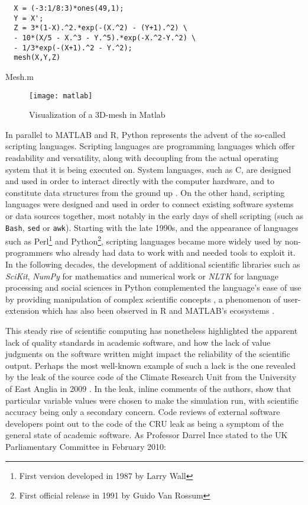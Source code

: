 \begin{listing}

  \begin{verbatim}
  X = (-3:1/8:3)*ones(49,1);
  Y = X';
  Z = 3*(1-X).^2.*exp(-(X.^2) - (Y+1).^2) \
  - 10*(X/5 - X.^3 - Y.^5).*exp(-X.^2-Y.^2) \
  - 1/3*exp(-(X+1).^2 - Y.^2);
  mesh(X,Y,Z)
\end{verbatim}
  \caption{Mesh.m}
  \label{code:mesh_m}
\end{listing}

\begin{figure}
  \texttt{[image: matlab]}
  \caption{Visualization of a 3D-mesh in Matlab}
  \label{graphic:mesh-visualization}
\end{figure}

In parallel to MATLAB and R, Python represents the advent of the so-called scripting languages. Scripting languages are programming  languages which offer readability and versatility, along with decoupling from the actual operating system that it is being executed on. System languages, such as C, are designed and used in order to interact directly with the computer hardware, and to constitute data structures from the ground up \citep{ousterhout_scripting_1998}. On the other hand, scripting languages were designed and used in order to connect existing software systems or data sources together, most notably in the early days of shell scripting (such as \lstinline{Bash}, \lstinline{sed} or \lstinline{awk}). Starting with the late 1990s, and the appearance of languages such as Perl\footnote{First version developed in 1987 by Larry Wall} and Python\footnote{First official release in 1991 by Guido Van Rossum}, scripting languages became more widely used by non-programmers who already had data to work with and needed tools to exploit it. In the following decades, the development of additional scientific libraries such as \emph{SciKit}, \emph{NumPy} for mathematics and numerical work or \emph{NLTK} for language processing and social sciences in Python complemented the language's ease of use by providing manipulation of complex scientific concepts \citep{millman_python_2011}, a phenomenon of user-extension which has also been observed in R and MATLAB's ecosystems \citep{moler_history_2020}.

This steady rise of scientific computing has nonetheless highlighted the apparent lack of quality standards in academic software, and how the lack of value judgments on the software written might impact the reliability of the scientific output. Perhaps the most well-known example of such a lack is the one revealed by the leak of the source code of the Climate Research Unit from the University of East Anglia in 2009 \citep{merali_computational_2010}. In the leak, inline comments of the authors, show that particular variable values were chosen to make the simulation run, with scientific accuracy being only a secondary concern. Code reviews of external software developers point out to the code of the CRU leak as being a symptom of the general state of academic software. As Professor Darrel Ince stated to the UK Parliamentary Committee in February 2010:

